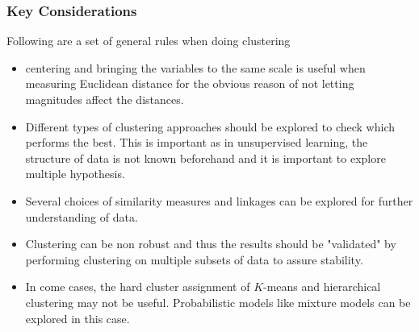 \documentclass[11pt, a4paper]{article}
\begin{document}
    \subsubsection{Key Considerations}
    Following are a set of general rules when doing clustering
    \begin{itemize}
        \item centering and bringing the variables to the same scale is useful when measuring Euclidean distance for the obvious reason of not letting magnitudes affect the distances.
        \item Different types of clustering approaches should be explored to check which performs the best. This is important as in unsupervised learning, the structure of data is not known beforehand and it is important to explore multiple hypothesis.
        \item Several choices of similarity measures and linkages can be explored for further understanding of data.
        \item Clustering can be non robust and thus the results should be "validated" by performing clustering on multiple subsets of data to assure stability.
        \item In come cases, the hard cluster assignment of $K$-means and hierarchical clustering may not be useful. Probabilistic models like mixture models can be explored in this case.
    \end{itemize}
\end{document}
